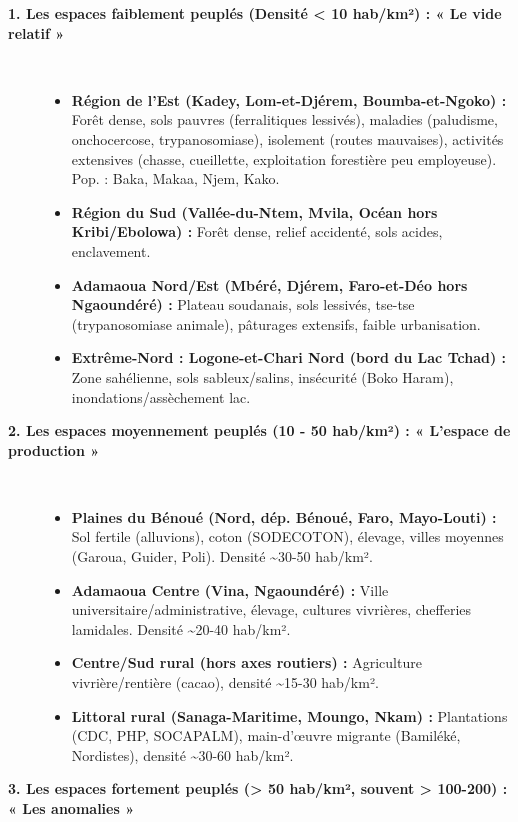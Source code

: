 \documentclass[11pt]{article}
\begin{document}
\begin{description}
    \item[\textbf{1. Les espaces faiblement peuplés (Densité < 10 hab/km²) : « Le vide relatif »}] \hfill \\
    \begin{itemize}
        \item \textbf{Région de l'Est (Kadey, Lom-et-Djérem, Boumba-et-Ngoko) :} Forêt dense, sols pauvres (ferralitiques lessivés), maladies (paludisme, onchocercose, trypanosomiase), isolement (routes mauvaises), activités extensives (chasse, cueillette, exploitation forestière peu employeuse). Pop. : Baka, Makaa, Njem, Kako.
        \item \textbf{Région du Sud (Vallée-du-Ntem, Mvila, Océan hors Kribi/Ebolowa) :} Forêt dense, relief accidenté, sols acides, enclavement.
        \item \textbf{Adamaoua Nord/Est (Mbéré, Djérem, Faro-et-Déo hors Ngaoundéré) :} Plateau soudanais, sols lessivés, tse-tse (trypanosomiase animale), pâturages extensifs, faible urbanisation.
        \item \textbf{Extrême-Nord : Logone-et-Chari Nord (bord du Lac Tchad) :} Zone sahélienne, sols sableux/salins, insécurité (Boko Haram), inondations/assèchement lac.
    \end{itemize}
    \item[\textbf{2. Les espaces moyennement peuplés (10 - 50 hab/km²) : « L'espace de production »}] \hfill \\
    \begin{itemize}
        \item \textbf{Plaines du Bénoué (Nord, dép. Bénoué, Faro, Mayo-Louti) :} Sol fertile (alluvions), coton (SODECOTON), élevage, villes moyennes (Garoua, Guider, Poli). Densité \textasciitilde 30-50 hab/km².
        \item \textbf{Adamaoua Centre (Vina, Ngaoundéré) :} Ville universitaire/administrative, élevage, cultures vivrières, chefferies lamidales. Densité \textasciitilde 20-40 hab/km².
        \item \textbf{Centre/Sud rural (hors axes routiers) :} Agriculture vivrière/rentière (cacao), densité \textasciitilde 15-30 hab/km².
        \item \textbf{Littoral rural (Sanaga-Maritime, Moungo, Nkam) :} Plantations (CDC, PHP, SOCAPALM), main-d'œuvre migrante (Bamiléké, Nordistes), densité \textasciitilde 30-60 hab/km².
    \end{itemize}
    \item[\textbf{3. Les espaces fortement peuplés (> 50 hab/km², souvent > 100-200) : « Les anomalies »}] \hfill \\

\end{description}
\end{document}

